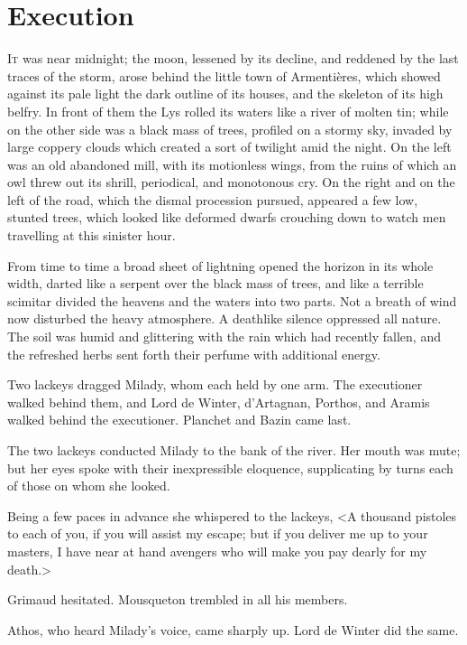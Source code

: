 
\chapter{Execution}

\lettrine[]{I}{t} was near midnight; the moon, lessened by its decline, and reddened by the last traces of the storm, arose behind the little town of Armentières, which showed against its pale light the dark outline of its houses, and the skeleton of its high belfry. In front of them the Lys rolled its waters like a river of molten tin; while on the other side was a black mass of trees, profiled on a stormy sky, invaded by large coppery clouds which created a sort of twilight amid the night. On the left was an old abandoned mill, with its motionless wings, from the ruins of which an owl threw out its shrill, periodical, and monotonous cry. On the right and on the left of the road, which the dismal procession pursued, appeared a few low, stunted trees, which looked like deformed dwarfs crouching down to watch men travelling at this sinister hour. 

From time to time a broad sheet of lightning opened the horizon in its whole width, darted like a serpent over the black mass of trees, and like a terrible scimitar divided the heavens and the waters into two parts. Not a breath of wind now disturbed the heavy atmosphere. A deathlike silence oppressed all nature. The soil was humid and glittering with the rain which had recently fallen, and the refreshed herbs sent forth their perfume with additional energy. 

Two lackeys dragged Milady, whom each held by one arm. The executioner walked behind them, and Lord de Winter, d'Artagnan, Porthos, and Aramis walked behind the executioner. Planchet and Bazin came last. 

The two lackeys conducted Milady to the bank of the river. Her mouth was mute; but her eyes spoke with their inexpressible eloquence, supplicating by turns each of those on whom she looked. 

Being a few paces in advance she whispered to the lackeys, <A thousand pistoles to each of you, if you will assist my escape; but if you deliver me up to your masters, I have near at hand avengers who will make you pay dearly for my death.> 

Grimaud hesitated. Mousqueton trembled in all his members. 

Athos, who heard Milady's voice, came sharply up. Lord de Winter did the same. 

